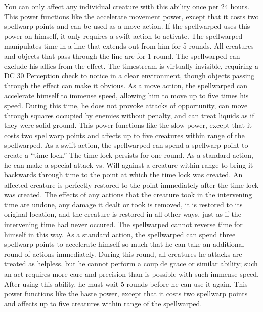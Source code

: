 You can only affect any individual creature with this ability once per 24 hours.
 This power functions like the accelerate movement power, except that it costs two spellwarp points and can be used as a move action. If the spellwarped uses this power on himself, it only requires a swift action to activate.
 The spellwarped manipulates time in a \arealarge line that extends out from him for 5 rounds. All creatures and objects that pass through the line are \slowed for 1 round. The spellwarped can exclude his allies from the effect. The timestream is virtually invisible, requiring a DC 30 Perception check to notice in a clear environment, though objects passing through the effect can make it obvious.
 As a move action, the spellwarped can accelerate himself to immense speed, allowing him to move up to five times his speed. During this time, he does not provoke attacks of opportunity, can move through squares occupied by enemies without penalty, and can treat liquids as if they were solid ground.
 This power functions like the slow power, except that it costs two spellwarp points and affects up to five creatures within \rngclose range of the spellwarped.
 As a swift action, the spellwarped can spend a spellwarp point to create a ``time lock.'' The time lock persists for one round. As a standard action, he can make a special attack vs. Will against a creature within \rngmed range to bring it backwards through time to the point at which the time lock was created. An affected creature is perfectly restored to the point immediately after the time lock was created. The effects of any actions that the creature took in the intervening time are undone, any damage it dealt or took is removed, it is restored to its original location, and the creature is restored in all other ways, just as if the intervening time had never occured. The spellwarped cannot reverse time for himself in this way.
 As a standard action, the spellwarped can spend three spellwarp points to accelerate himself so much that he can take an additional round of actions immediately. During this round, all creatures he attacks are treated as helpless, but he cannot perform a coup de grace or similar ability; such an act requires more care and precision than is possible with such immense speed. After using this ability, he must wait 5 rounds before he can use it again.
 This power functions like the haste power, except that it costs two spellwarp points and affects up to five creatures within \rngclose range of the spellwarped.
